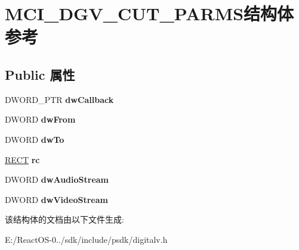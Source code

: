 \hypertarget{struct_m_c_i___d_g_v___c_u_t___p_a_r_m_s}{}\section{M\+C\+I\+\_\+\+D\+G\+V\+\_\+\+C\+U\+T\+\_\+\+P\+A\+R\+M\+S结构体 参考}
\label{struct_m_c_i___d_g_v___c_u_t___p_a_r_m_s}
\subsection*{Public 属性}
\begin{DoxyCompactItemize}
\item 
\mbox{\label{struct_m_c_i___d_g_v___c_u_t___p_a_r_m_s_a58a50c8b524262e89da24622264e9ac0}} 
D\+W\+O\+R\+D\+\_\+\+P\+TR {\bfseries dw\+Callback}
\item 
\mbox{\label{struct_m_c_i___d_g_v___c_u_t___p_a_r_m_s_a81f48dfc09c4519d20efda255bec572c}} 
D\+W\+O\+RD {\bfseries dw\+From}
\item 
\mbox{\label{struct_m_c_i___d_g_v___c_u_t___p_a_r_m_s_aaaeab504831cb296d6f96412583424e0}} 
D\+W\+O\+RD {\bfseries dw\+To}
\item 
\mbox{\label{struct_m_c_i___d_g_v___c_u_t___p_a_r_m_s_ac8fe77c96a3fe5a057fddd51bb50b711}} 
\hyperlink{structtag_r_e_c_t}{R\+E\+CT} {\bfseries rc}
\item 
\mbox{\label{struct_m_c_i___d_g_v___c_u_t___p_a_r_m_s_a422105d84e73e2168a2ba963b2aef9c6}} 
D\+W\+O\+RD {\bfseries dw\+Audio\+Stream}
\item 
\mbox{\label{struct_m_c_i___d_g_v___c_u_t___p_a_r_m_s_a5b3fd75fcb664972098c55978b3cd4e0}} 
D\+W\+O\+RD {\bfseries dw\+Video\+Stream}
\end{DoxyCompactItemize}


该结构体的文档由以下文件生成\+:\begin{DoxyCompactItemize}
\item 
E\+:/\+React\+O\+S-\/0../sdk/include/psdk/digitalv.\+h\end{DoxyCompactItemize}
